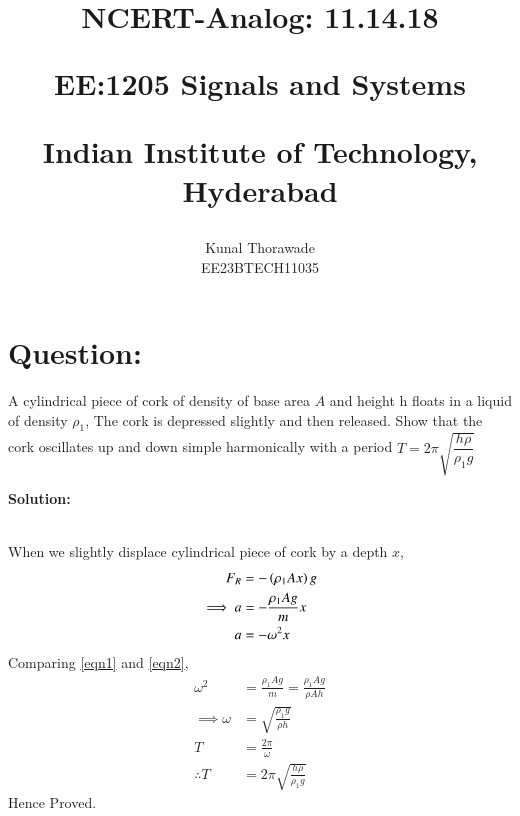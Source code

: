 \documentclass[journal,12pt,twocolumn]{IEEEtran}
\theoremstyle{remark}
\begin{document}
%




\vspace{3cm}

\title{
	NCERT-Analog: 11.14.18

	\large{EE:1205 Signals and Systems}

	Indian Institute of Technology, Hyderabad
}
\author{Kunal Thorawade

EE23BTECH11035
}	
\maketitle


\newpage


\bigskip
 
 \renewcommand{\thefigure}{\theenumi}
 \renewcommand{\thetable}{\arabic{table}}

 \section{Question:}
 A cylindrical piece of cork of density of base area $A$ and height h floats in a liquid of density $\rho_1$, The cork is depressed slightly and then released. Show that the cork oscillates up and down simple harmonically with a period $T = 2\pi\sqrt{\dfrac{h\rho}{\rho_{1}g}}$

 \textbf{Solution:} 
 
 \begin{figure}[!ht]
	     
 \end{figure} \\
 When we slightly displace cylindrical piece of cork by a depth $x$,
 \begin{align}
	      F_R &= -\left(\rho_1Ax\right)g \\
	          \implies a &= -\frac{\rho_1Ag}{m}x \label{eqn1} \\
		      a &= -\omega^2x \label{eqn2}
 \end{align}
 Comparing \eqref{eqn1} and \eqref{eqn2},
 \begin{align}
	     \omega^2 &= \frac{\rho_1Ag}{m} = \frac{\rho_1Ag}{\rho Ah} \\
	         \implies\omega &= \sqrt{\frac{\rho_1g}{\rho h}} \\
		     T &= \frac{2\pi}{\omega} \\
		         \therefore T &= 2\pi\sqrt{\frac{h\rho}{\rho_1 g}}
 \end{align}
 Hence Proved.
\end{document}
